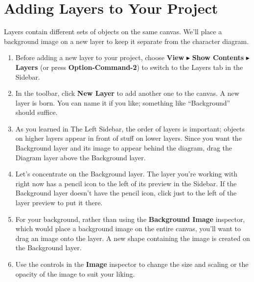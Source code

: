 \documentclass[../main.tex]{subfiles}
\begin{document}
\section{Adding Layers to Your Project}

Layers contain different sets of objects on the same canvas. We'll place a background image on a
new layer to keep it separate from the character diagram.

\begin{enumerate}
  \item Before adding a new layer to your project, choose \textbf{View} $\blacktriangleright$
    \textbf{Show Contents} $\blacktriangleright$ \textbf{Layers} (or press
    \textbf{Option-Command-2}) to switch to the Layers tab in the Sidebar.
  \item In the toolbar, click \textbf{New Layer} to add another one to the canvas. A new layer
    is born. You can name it if you like; something like ``Background'' should suffice.

  \item As you learned in The Left Sidebar, the order of layers is important; objects on higher
    layers appear in front of stuff on lower layers. Since you want the Background layer and its
    image to appear behind the diagram, drag the Diagram layer above the Background layer.

  \item Let's concentrate on the Background layer. The layer you're working with right now has a
    pencil icon to the left of its preview in the Sidebar. If the Background layer doesn't have
    the pencil icon, click just to the left of the layer preview to put it there.

  \item For your background, rather than using the \textbf{Background Image} inspector, which
    would place a background image on the entire canvas, you'll want to drag an image onto the
    layer. A new shape containing the image is created on the Background layer.

  \item Use the controls in the \textbf{Image} inspector to change the size and scaling or the
    opacity of the image to suit your liking.


\end{enumerate}
\end{document}
